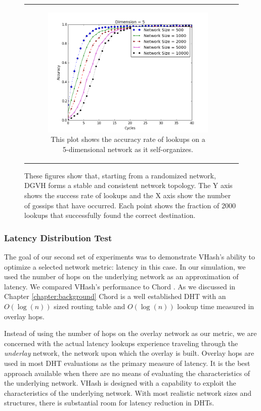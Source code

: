 \begin{figure}
\begin{tabular}{cc}
		\begin{subfigure}{0.5\columnwidth}
			\includegraphics[width=\linewidth]{figs/conv_d5}
			\caption{This plot shows the accuracy rate of lookups on a 5-dimensional network as it self-organizes.}
			\label{fig:conv5}
		\end{subfigure}

	\end{tabular}
	\caption{These figures show that, starting from a randomized network, DGVH forms a stable and consistent network topology.
		The Y axis shows the success rate of lookups and the X axis show the number of gossips that have occurred.
		Each point shows the fraction of 2000 lookups that successfully found the correct destination.}

\end{figure}

\subsubsection{Latency Distribution Test}
The goal of our second set of experiments was to demonstrate VHash's ability to optimize a selected network metric: latency in this case.
In our simulation, we used the number of hops on the underlying network as an approximation of latency.
We compared VHash's performance to Chord \cite{chord}.
As we discussed in Chapter \ref{chapter:background} Chord is a well established DHT with an $O(\log(n))$ sized routing table and $O(\log(n))$ lookup time measured in overlay hops.

Instead of using the number of hops on the overlay network as our metric, we are concerned with the actual latency lookups experience traveling through the \emph{underlay} network, the network upon which the overlay is built.
Overlay hops are used in most DHT evaluations as the primary measure of latency.
It is the best approach available when there are no means of evaluating the characteristics of the underlying network.
VHash is designed with a capability to exploit the characteristics of the underlying network.
With most realistic network sizes and structures, there is substantial room for latency reduction in DHTs.

